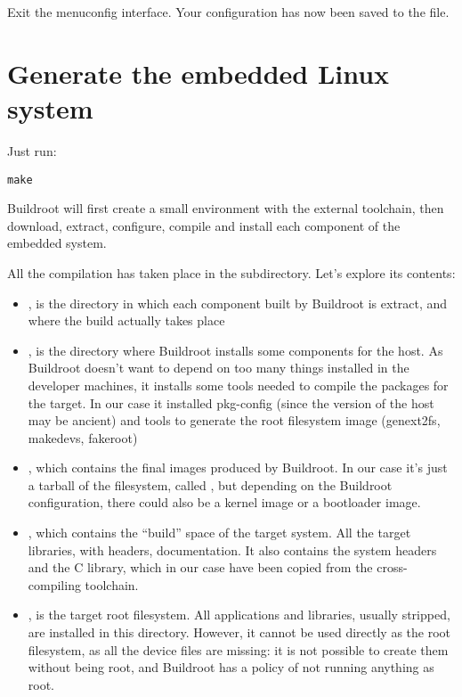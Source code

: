 Exit the menuconfig interface. Your configuration has now been saved
to the  file.

\section{Generate the embedded Linux system}

Just run:

\begin{verbatim}
make
\end{verbatim}

Buildroot will first create a small environment with the external
toolchain, then download, extract, configure, compile and install each
component of the embedded system.

All the compilation has taken place in the  subdirectory. Let's
explore its contents:

\begin{itemize}

\item {}, is the directory in which each component built by
  Buildroot is extract, and where the build actually takes place

\item {}, is the directory where Buildroot installs some
  components for the host. As Buildroot doesn't want to depend on too
  many things installed in the developer machines, it installs some
  tools needed to compile the packages for the target. In our case it
  installed pkg-config (since the version of the host may be ancient)
  and tools to generate the root filesystem image (genext2fs,
  makedevs, fakeroot)

\item {}, which contains the final images produced by
  Buildroot. In our case it's just a tarball of the filesystem, called
  , but depending on the Buildroot configuration,
  there could also be a kernel image or a bootloader image.

\item {}, which contains the “build” space of the target
  system. All the target libraries, with headers, documentation. It
  also contains the system headers and the C library, which in our
  case have been copied from the cross-compiling toolchain.

\item {}, is the target root filesystem. All applications
  and libraries, usually stripped, are installed in this
  directory. However, it cannot be used directly as the root
  filesystem, as all the device files are missing: it is not possible
  to create them without being root, and Buildroot has a policy of not
  running anything as root.

\end{itemize}

